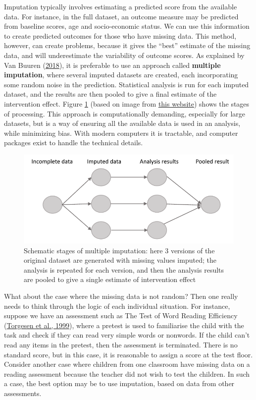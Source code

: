\documentclass{krantz}
\begin{document}
Imputation typically involves estimating a predicted score from the available data. For instance, in the full dataset, an outcome measure may be predicted from baseline scores, age and socio-economic status. We can use this information to create predicted outcomes for those who have missing data. This method, however, can create problems, because it gives the ``best'' estimate of the missing data, and will underestimate the variability of outcome scores. As explained by Van Buuren (\protect\hyperlink{ref-vanbuuren2018}{2018}), it is preferable to use an approach called \textbf{multiple imputation}, where several imputed datasets are created, each incorporating some random noise in the prediction. Statistical analysis is run for each imputed dataset, and the results are then pooled to give a final estimate of the intervention effect. Figure \ref{fig:micefig} (based on image from \href{https://data.library.virginia.edu/getting-started-with-multiple-imputation-in-r/}{this website}) shows the stages of processing. This approach is computationally demanding, especially for large datasets, but is a way of ensuring all the available data is used in an analysis, while minimizing bias. With modern computers it is tractable, and computer packages exist to handle the technical details.

\begin{center}
\begin{figure}
\includegraphics[width=0.75\linewidth]{images_bw/mice_fig} \caption{Schematic stages of multiple imputation: here 3 versions of the original dataset are generated with missing values imputed; the analysis is repeated for each version, and then the analysis results are pooled to give a single estimate of intervention effect}\label{fig:micefig}
\end{figure}
\end{center}

What about the case where the missing data is not random? Then one really needs to think through the logic of each individual situation. For instance, suppose we have an assessment such as The Test of Word Reading Efficiency (\protect\hyperlink{ref-torgesen1999}{Torgesen et al., 1999}), where a pretest is used to familiarise the child with the task and check if they can read very simple words or nonwords. If the child can't read any items in the pretest, then the assessment is terminated. There is no standard score, but in this case, it is reasonable to assign a score at the test floor. Consider another case where children from one classroom have missing data on a reading assessment because the teacher did not wish to test the children. In such a case, the best option may be to use imputation, based on data from other assessments.
\end{document}
